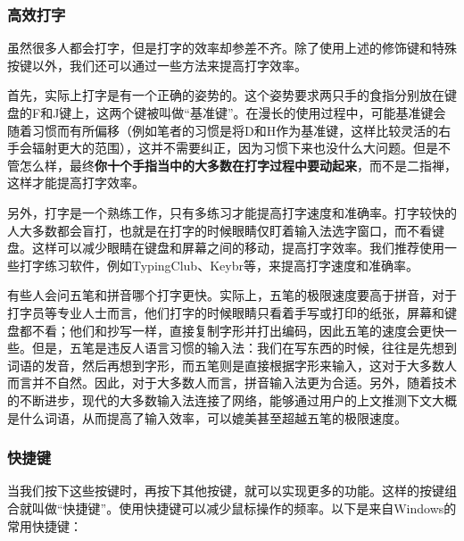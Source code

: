 \subsubsection{高效打字}

虽然很多人都会打字，但是打字的效率却参差不齐。除了使用上述的修饰键和特殊按键以外，我们还可以通过一些方法来提高打字效率。

首先，实际上打字是有一个正确的姿势的。这个姿势要求两只手的食指分别放在键盘的F和J键上，这两个键被叫做“基准键”。在漫长的使用过程中，可能基准键会随着习惯而有所偏移（例如笔者的习惯是将D和H作为基准键，这样比较灵活的右手会辐射更大的范围），这并不需要纠正，因为习惯下来也没什么大问题。但是不管怎么样，最终\textbf{你十个手指当中的大多数在打字过程中要动起来}，而不是二指禅，这样才能提高打字效率。

另外，打字是一个熟练工作，只有多练习才能提高打字速度和准确率。打字较快的人大多数都会盲打，也就是在打字的时候眼睛仅盯着输入法选字窗口，而不看键盘。这样可以减少眼睛在键盘和屏幕之间的移动，提高打字效率。我们推荐使用一些打字练习软件，例如TypingClub、Keybr等，来提高打字速度和准确率。

有些人会问五笔和拼音哪个打字更快。实际上，五笔的极限速度要高于拼音，对于打字员等专业人士而言，他们打字的时候眼睛只看着手写或打印的纸张，屏幕和键盘都不看；他们和抄写一样，直接复制字形并打出编码，因此五笔的速度会更快一些。但是，五笔是违反人语言习惯的输入法：我们在写东西的时候，往往是先想到词语的发音，然后再想到字形，而五笔则是直接根据字形来输入，这对于大多数人而言并不自然。因此，对于大多数人而言，拼音输入法更为合适。另外，随着技术的不断进步，现代的大多数输入法连接了网络，能够通过用户的上文推测下文大概是什么词语，从而提高了输入效率，可以媲美甚至超越五笔的极限速度。

\subsubsection{快捷键}

当我们按下这些按键时，再按下其他按键，就可以实现更多的功能。这样的按键组合就叫做“快捷键”。使用快捷键可以减少鼠标操作的频率。以下是来自Windows的常用快捷键：

